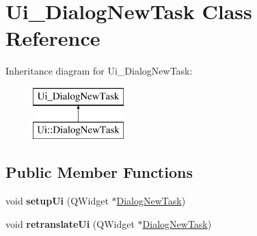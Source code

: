 \hypertarget{class_ui___dialog_new_task}{}\section{Ui\+\_\+\+Dialog\+New\+Task Class Reference}
\label{class_ui___dialog_new_task}
Inheritance diagram for Ui\+\_\+\+Dialog\+New\+Task\+:\begin{figure}[H]
\begin{center}
\leavevmode
\includegraphics[height=2.000000cm]{class_ui___dialog_new_task}
\end{center}
\end{figure}
\subsection*{Public Member Functions}
\begin{DoxyCompactItemize}
\item 
\hypertarget{class_ui___dialog_new_task_a70b9e273fb6d23ba9299140639d62691}{}void {\bfseries setup\+Ui} (Q\+Widget $\ast$\hyperlink{class_dialog_new_task}{Dialog\+New\+Task})\label{class_ui___dialog_new_task_a70b9e273fb6d23ba9299140639d62691}

\item 
\hypertarget{class_ui___dialog_new_task_a0969a763f8bc7c71133c4405f8b06ad6}{}void {\bfseries retranslate\+Ui} (Q\+Widget $\ast$\hyperlink{class_dialog_new_task}{Dialog\+New\+Task})\label{class_ui___dialog_new_task_a0969a763f8bc7c71133c4405f8b06ad6}

\end{DoxyCompactItemize}
